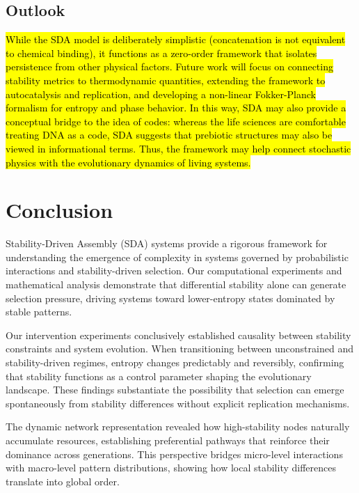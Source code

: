\documentclass[preprint,12pt]{elsarticle}
\newcommand{\added}[1]{\hl{#1}}
\begin{document}
\subsection*{Outlook}

\added{
While the SDA model is deliberately
simplistic (concatenation is not equivalent to chemical binding), it functions as
a zero-order framework that isolates persistence from other physical factors.
Future work will focus on connecting stability metrics to thermodynamic
quantities, extending the framework to autocatalysis and replication, and
developing a non-linear Fokker-Planck formalism for entropy and phase
behavior. In this way, SDA may also provide a conceptual bridge to the idea of
codes: whereas the life sciences are comfortable treating DNA as a code, SDA
suggests that prebiotic structures may also be viewed in informational
terms. Thus, the framework may help connect stochastic physics with
the evolutionary dynamics of living systems.
}



\section{Conclusion}

Stability-Driven Assembly (SDA) systems provide a rigorous framework for understanding the emergence of complexity in systems governed by probabilistic interactions and stability-driven selection. Our computational experiments and mathematical analysis demonstrate that differential stability alone can generate selection pressure, driving systems toward lower-entropy states dominated by stable patterns.

Our intervention experiments conclusively established causality between stability constraints and system evolution. When transitioning between unconstrained and stability-driven regimes, entropy changes predictably and reversibly, confirming that stability functions as a control parameter shaping the evolutionary landscape. These findings substantiate the possibility that selection can emerge spontaneously from stability differences without explicit replication mechanisms.

The dynamic network representation revealed how high-stability nodes naturally accumulate resources, establishing preferential pathways that reinforce their dominance across generations. This perspective bridges micro-level interactions with macro-level pattern distributions, showing how local stability differences translate into global order.
\end{document}
